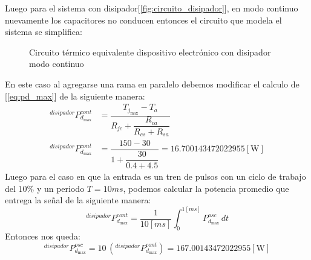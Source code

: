 \documentclass[10pt]{article}
\begin{document}
Luego para el sistema con disipador[\ref{fig:circuito_disipador}], en modo continuo nuevamente los capacitores no conducen entonces el circuito que modela el sistema se simplifica:
\begin{figure}[H]
\centering
{}
\caption{Circuito térmico equivalente dispositivo electrónico con disipador modo continuo}\label{fig:circuito_disipador_sin_capacitores}
\end{figure}
En este caso al agregarse una rama en paralelo debemos modificar el calculo de [\ref{eq:pd_max}] de la siguiente manera:
\begin{align}
   ^{disipador}P_{d_{\max}}^{cont}&=\dfrac{T_{j_{\max}}-T_a}{R_{jc}+\dfrac{R_{ca}}{R_{cs}+R_{sa}}}\\[10pt]
   ^{disipador}P_{d_{\max}}^{cont}&=\dfrac{150 - 30}{1 + \dfrac{30}{0.4 + 4.5}}=16.700143472022955 [\si{\watt}]\label{eq:pd_max_disipador}
\end{align}
Luego para el caso en que la entrada es un tren de pulsos con un ciclo de trabajo del $10\%$ y un periodo $T=10ms$, podemos calcular la potencia promedio
que entrega la señal de la siguiente manera:
\begin{equation}
   ^{disipador}P_{d_{\max}}^{cont}=\frac{1}{10[\si{ms}]}\int_0^{1[\si{ms}]}P_{d_{\max}}^{osc}\,dt
\end{equation}
Entonces nos queda:
\begin{equation}
   ^{disipador}P_{d_{\max}}^{osc}=10\,(^{disipador}P_{d_{\max}}^{cont})=167.00143472022955[\si{\watt}]
\end{equation}
\end{document}
